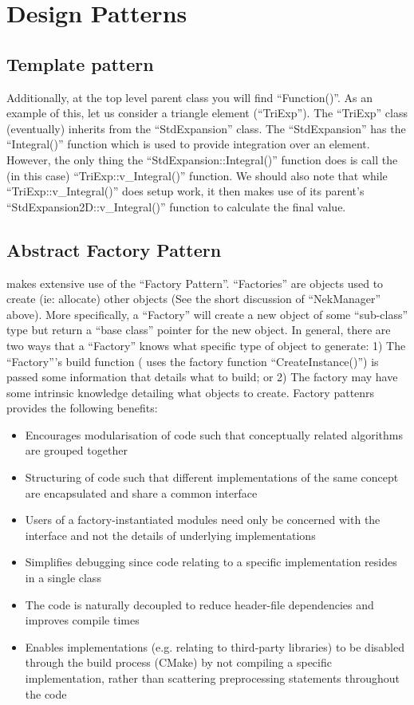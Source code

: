 \section{Design Patterns}
\subsection{Template pattern}
Additionally, at the top level parent class you will find
``Function()''.  As an example of this, let us consider a triangle
element (``TriExp'').  The ``TriExp'' class (eventually) inherits
from the ``StdExpansion'' class.  The ``StdExpansion'' has the
``Integral()'' function which is used to provide integration over
an element.  However, the only thing the
``StdExpansion::Integral()'' function does is call the (in this case)
``TriExp::v\_Integral()'' function.  We should also note that while
``TriExp::v\_Integral()'' does setup work, it then makes use of its parent's
``StdExpansion2D::v\_Integral()'' function to calculate the final value.

\subsection{Abstract Factory Pattern}

{\nek} makes extensive use of the ``Factory Pattern''.
``Factories'' are objects used to create (ie: allocate) other objects
(See the short discussion of ``NekManager'' above).  More
specifically, a ``Factory'' will create a new object of some
``sub-class'' type but return a ``base class'' pointer for the new
object. In general, there are two ways that a ``Factory'' knows what
specific type of object to generate: 1) The ``Factory'''s build
function ({\nek} uses the factory function ``CreateInstance()'') is
passed some information that details what to build; or 2) The factory may
have some intrinsic knowledge detailing what objects to create. 
Factory pattenrs provides the following benefits:
\begin{itemize}
\item Encourages modularisation of code such that conceptually related
algorithms are grouped together
\item Structuring of code such that different implementations of the same
concept are encapsulated and share a common interface
\item Users of a factory-instantiated modules need only be concerned with the
 interface and not the details of underlying implementations
\item Simplifies debugging since code relating to a specific implementation
 resides in a single class
\item The code is naturally decoupled to reduce header-file dependencies and
 improves compile times
\item Enables implementations (e.g. relating to third-party libraries) to be
 disabled through the build process (CMake) by not compiling a specific 
 implementation, rather than scattering preprocessing statements throughout the
 code
\end{itemize}


